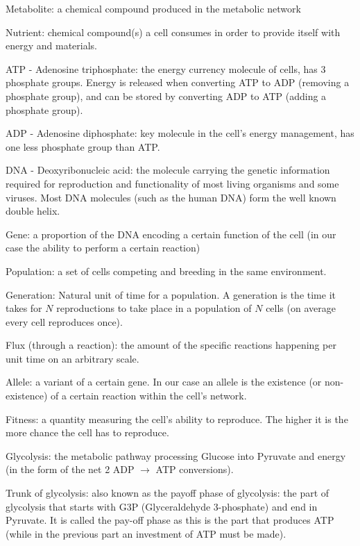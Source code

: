 \documentclass[10pt,a4paper]{article}
\begin{document}
	\begin{framed}
		
	Metabolite: a chemical compound produced in the metabolic network

	Nutrient: chemical compound(s) a cell consumes in order to provide itself with energy and materials.

	ATP - Adenosine triphosphate: the energy currency molecule of cells, has 3 phosphate groups. Energy is released when converting ATP to ADP (removing a phosphate group), and can be stored by converting ADP to ATP (adding a phosphate group).

	ADP - Adenosine diphosphate: key molecule in the cell's energy management, has one less phosphate group than ATP.

	DNA - Deoxyribonucleic acid: the molecule carrying the genetic information required for reproduction and functionality of most living organisms and some viruses. Most DNA molecules (such as the human DNA) form the well known double helix. 

	Gene: a proportion of the DNA encoding a certain function of the cell (in our case the ability to perform a certain reaction)

	Population: a set of cells competing and breeding in the same environment.

	Generation: Natural unit of time for a population. A generation is the time it takes for $N$ reproductions to take place in a population of $N$ cells (on average every cell reproduces once).

	Flux (through a reaction): the amount of the specific reactions happening per unit time on an arbitrary scale. 

	Allele: a variant of a certain gene. In our case an allele is the existence (or non-existence) of a certain reaction within the cell's network.

	Fitness: a quantity measuring the cell's ability to reproduce. The higher it is the more chance the cell has to reproduce.

	Glycolysis: the metabolic pathway processing Glucose into Pyruvate and energy (in the form of the net 2 ADP $\rightarrow$ ATP conversions).

	Trunk of glycolysis: also known as the payoff phase of glycolysis: the part of glycolysis that starts with G3P (Glyceraldehyde 3-phosphate) and end in Pyruvate. It is called the pay-off phase as this is the part that produces ATP (while in the previous part an investment of ATP must be made).

	\end{framed}
\end{document}
